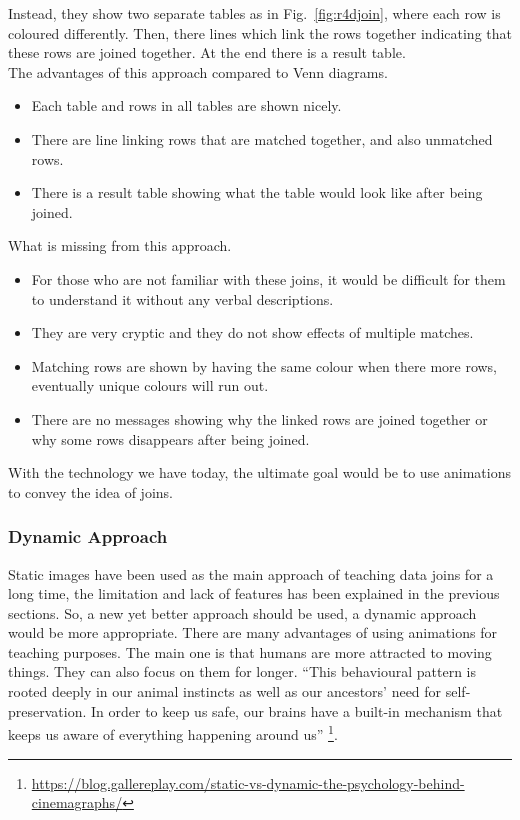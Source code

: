 Instead, they show two separate tables as in Fig.~\ref{fig:r4djoin}, where each row is coloured differently. Then, there lines which link the rows together indicating that these rows are joined together. At the end there is a result table. \\

The advantages of this approach compared to Venn diagrams.
\begin{itemize}
    \item Each table and rows in all tables are shown nicely.
    \item There are line linking rows that are matched together, and also unmatched rows.
    \item There is a result table showing what the table would look like after being joined.
\end{itemize}
	
What is missing from this approach.

\begin{itemize}
    \item For those who are not familiar with these joins, it would be difficult for them to understand it without any verbal descriptions.
    \item They are very cryptic and they do not show effects of multiple matches.
    \item Matching rows are shown by having the same colour when there more rows, eventually unique colours will run out.
    \item There are no messages showing why the linked rows are joined together or why some rows disappears after being joined.
\end{itemize}

With the technology we have today, the ultimate goal would be to use animations to convey the idea of joins. 

\subsubsection{Dynamic Approach}

Static images have been used as the main approach of teaching data joins for a long time, the limitation and lack of features has been explained in the previous sections. So, a new yet better approach should be used, a dynamic approach would be more appropriate.
There are many advantages of using animations for teaching purposes. The main one is that humans are more attracted to moving things. They can also focus on them for longer. “This behavioural pattern is rooted deeply in our animal instincts as well as our ancestors’ need for self-preservation. In order to keep us safe, our brains have a built-in mechanism that keeps us aware of everything happening around us” \footnote[1]{\href{https://blog.gallereplay.com/static-vs-dynamic-the-psychology-behind-cinemagraphs/}{https://blog.gallereplay.com/static-vs-dynamic-the-psychology-behind-cinemagraphs/}}. \\

